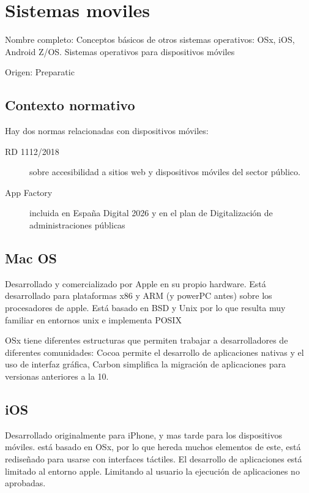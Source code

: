 \setcounter{section}{61} %
\section{Sistemas moviles}

Nombre completo: Conceptos básicos de otros sistemas operativos: OSx, iOS, Android Z/OS. Sistemas operativos para dispositivos móviles

Origen: Preparatic

\localtableofcontents

\subsection{Contexto normativo}
    Hay dos normas relacionadas con dispositivos móviles:
    \begin{description}
        \item[RD 1112/2018] sobre accesibilidad a sitios web y dispositivos móviles del sector público.
        \item[App Factory] incluida en España Digital 2026 y en el plan de Digitalización de administraciones públicas
    \end{description}

\subsection{Mac OS}
    Desarrollado y comercializado por Apple en su propio hardware. Está desarrollado para plataformas x86 y ARM (y powerPC antes) sobre los procesadores de apple. Está basado en BSD y Unix por lo que resulta muy familiar en entornos unix e implementa POSIX

    OSx tiene diferentes estructuras que permiten trabajar a desarrolladores de diferentes comunidades: Cocoa permite el desarrollo de aplicaciones nativas y el uso de interfaz gráfica, Carbon simplifica la migración de aplicaciones para versionas anteriores a la 10.

\subsection{iOS}
    Desarrollado originalmente para iPhone, y mas tarde para los dispositivos móviles. está basado en OSx, por lo que hereda muchos elementos de este, está rediseñado para usarse con interfaces táctiles. El desarrollo de aplicaciones está limitado al entorno apple. Limitando al usuario la ejecución de aplicaciones no aprobadas.

